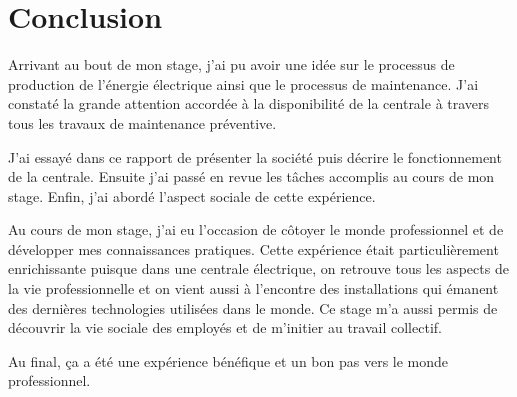 \chapter*{Conclusion}
Arrivant au bout de mon stage, j'ai pu avoir une idée sur le processus de production de l'énergie électrique ainsi que le processus de maintenance. 
 J'ai constaté la grande attention accordée à la disponibilité de la centrale à travers tous les travaux de maintenance préventive.

J'ai essayé dans ce rapport de présenter la société puis décrire le fonctionnement de la centrale. Ensuite j'ai passé en revue les tâches accomplis au cours de mon stage. Enfin, j'ai abordé l'aspect sociale de cette expérience.


Au cours de mon stage, j'ai eu l'occasion de côtoyer le monde professionnel et de développer mes connaissances pratiques. Cette  expérience était particulièrement enrichissante puisque dans une centrale électrique, on retrouve tous les aspects de la vie professionnelle et on vient aussi à l'encontre  des installations qui émanent des dernières technologies utilisées  dans le monde. Ce  stage m'a aussi permis de découvrir la vie sociale des employés et de m'initier au travail collectif.


Au final, ça a été une expérience bénéfique et un bon pas vers le monde professionnel.

